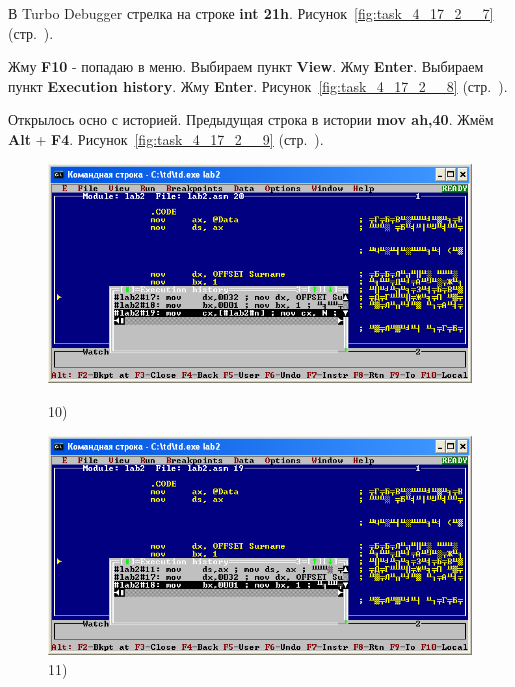 В Turbo Debugger стрелка на строке \textbf{int 21h}.
Рисунок~\ref{fig:task_4_17_2__7} (стр.~\pageref{fig:task_4_17_2__7}).

Жму \textbf{F10} - попадаю в меню.
Выбираем пункт \textbf{View}.
Жму \textbf{Enter}.
Выбираем пункт \textbf{Execution history}.
Жму \textbf{Enter}.
Рисунок~\ref{fig:task_4_17_2__8} (стр.~\pageref{fig:task_4_17_2__8}).

Открылось осно с историей.
Предыдущая строка в истории \textbf{mov ah,40}.
Жмём \textbf{Alt} + \textbf{F4}.
Рисунок~\ref{fig:task_4_17_2__9} (стр.~\pageref{fig:task_4_17_2__9}).

\begin{figure}[!htp]
    \centering
    \begin{minipage}{0.32\textwidth}
        \centering
        \includegraphics[width=.99\linewidth]
            {../_INCLUDES/task-4-17-2/10.png}
        \caption{10) }
        \label{fig:task_4_17_2__10}
    \end{minipage}
    \begin {minipage}{0.32\textwidth}
        \centering
        \includegraphics[width=.99\linewidth]
            {../_INCLUDES/task-4-17-2/11.png}
        \caption{11) }
        \label{fig:task_4_17_2__11}
    \end{minipage}

\end{figure}
